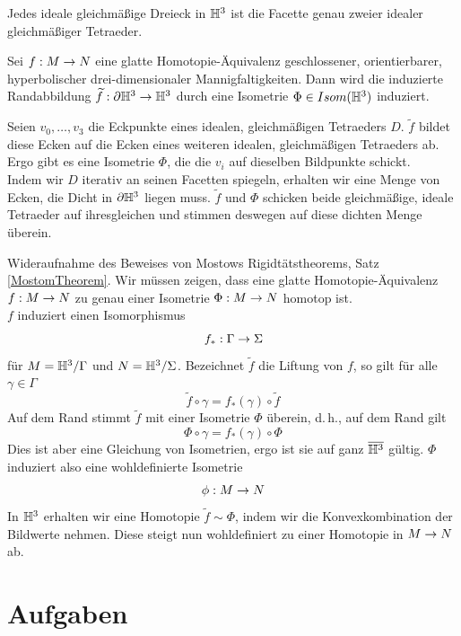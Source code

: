 \documentclass{book}
\begin{document}
\Bem{}
Jedes ideale gleichmäßige Dreieck in $\mathbb{H}^3$ ist die Facette genau zweier idealer gleichmäßiger Tetraeder.

\Prop{}
Sei $f : M \overset{}{\rightarrow} N$ eine glatte Homotopie-Äquivalenz geschlossener, orientierbarer, hyperbolischer drei-dimensionaler Mannigfaltigkeiten. Dann wird die induzierte Randabbildung $\widetilde{f} : \partial \mathbb{H}^3 \overset{}{\rightarrow} \mathbb{H}^3$ durch eine Isometrie $\Phi \in Isom(\mathbb{H}^3)$ induziert.
\begin{Beweis}{}
	Seien $v_0,\ldots, v_3$ die Eckpunkte eines idealen, gleichmäßigen Tetraeders $D$. $\widetilde{f}$ bildet diese Ecken auf die Ecken eines weiteren idealen, gleichmäßigen Tetraeders ab. Ergo gibt es eine Isometrie $\Phi$, die die $v_i$ auf dieselben Bildpunkte schickt.\\
	Indem wir $D$ iterativ an seinen Facetten spiegeln, erhalten wir eine Menge von Ecken, die Dicht in $\partial \mathbb{H}^3$ liegen muss. $\widetilde{f}$ und $\Phi$ schicken beide gleichmäßige, ideale Tetraeder auf ihresgleichen und stimmen deswegen auf diese dichten Menge überein.
\end{Beweis}

\begin{Beweis}{Wideraufnahme des Beweises von Mostows Rigidtätstheorems, Satz \ref{MostomTheorem}.}
	Wir müssen zeigen, dass eine glatte Homotopie-Äquivalenz $f : M \overset{}{\rightarrow} N$ zu genau einer Isometrie $\Phi : M \overset{}{\rightarrow} N$ homotop ist.\\
	$f$ induziert einen Isomorphismus
	\[ f_* : \Gamma \overset{}{\rightarrow} \Sigma \]
	für $M = \mathbb{H}^3 / \Gamma$ und $N = \mathbb{H}^3 / \Sigma$. Bezeichnet $\widetilde{f}$ die Liftung von $f$, so gilt für alle $\gamma \in \Gamma$
	\[ \widetilde{f} \circ \gamma = f_*(\gamma) \circ \widetilde{f} \]
	Auf dem Rand stimmt $\widetilde{f}$ mit einer Isometrie $\Phi$ überein, d.\,h., auf dem Rand gilt
	\[ \Phi \circ \gamma = f_*(\gamma) \circ \Phi \]
	Dies ist aber eine Gleichung von Isometrien, ergo ist sie auf ganz $\overline{\mathbb{H}^3}$ gültig. $\Phi$ induziert also eine wohldefinierte Isometrie
	\[ \phi : M \overset{}{\rightarrow} N \]
	In $\mathbb{H}^3$ erhalten wir eine Homotopie $\widetilde{f} \sim \Phi$, indem wir die Konvexkombination der Bildwerte nehmen. Diese steigt nun wohldefiniert zu einer Homotopie in $M\overset{}{\rightarrow} N$ ab.
\end{Beweis}

\chapter{Aufgaben}
\end{document}

